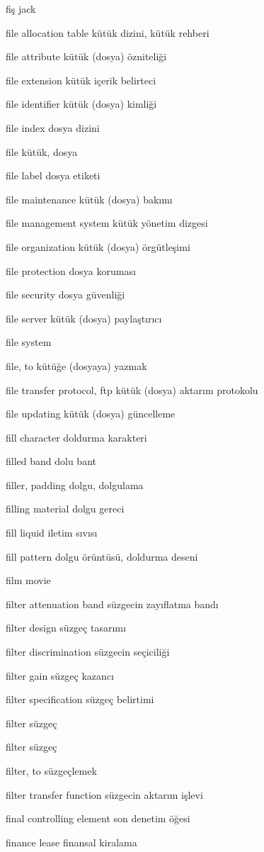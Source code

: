 \documentclass[12pt,fleqn]{article}\usepackage{../../common}
\begin{document}
fiş jack

file allocation table kütük dizini, kütük rehberi

file attribute kütük (dosya) özniteliği

file extension kütük içerik belirteci

file identifier kütük (dosya) kimliği

file index dosya dizini

file kütük, dosya

file label dosya etiketi

file maintenance kütük (dosya) bakımı

file management system kütük yönetim dizgesi

file organization kütük (dosya) örgütleşimi

file protection dosya koruması

file security dosya güvenliği

file server kütük (dosya) paylaştırıcı

file system

file, to kütüğe (dosyaya) yazmak

file transfer protocol, ftp kütük (dosya) aktarım protokolu

file updating kütük (dosya) güncelleme

fill character doldurma karakteri

filled band dolu bant

filler, padding dolgu, dolgulama

filling material dolgu gereci

fill liquid iletim sıvısı

fill pattern dolgu örüntüsü, doldurma deseni

film movie

filter attenuation band süzgecin zayıflatma bandı

filter design süzgeç tasarımı

filter discrimination süzgecin seçiciliği

filter gain süzgeç kazancı

filter specification süzgeç belirtimi

filter süzgeç

filter süzgeç

filter, to süzgeçlemek

filter transfer function süzgecin aktarım işlevi

final controlling element son denetim öğesi

finance lease finansal kiralama
\end{document}
